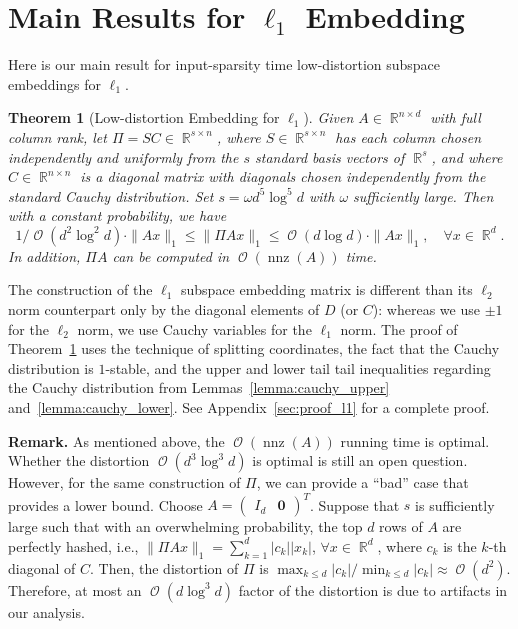 \documentclass[11pt]{article}
\newtheorem{theorem}{Theorem}
\DeclareMathOperator{\bigO}{\mathcal{O}}
\DeclareMathOperator{\nnz}{nnz}
\DeclareMathOperator{\R}{\mathbb{R}}
\begin{document}
\section{Main Results for $\ell_1$ Embedding}
\label{sxn:l1} 

Here is our main result for input-sparsity time low-distortion subspace
embeddings for $\ell_1$.

\begin{theorem}[Low-distortion Embedding for $\ell_1$]
  \label{thm:sparse_l1}
  Given $A \in \R^{n \times d}$ with full column rank, let $\Pi = S C \in \R^{s
    \times n}$, where $S \in \R^{s \times n}$ has each column chosen
  independently and uniformly from the $s$ standard basis vectors of $\R^s$, and
  where $C \in \R^{n \times n}$ is a diagonal matrix with diagonals chosen
  independently from the standard Cauchy distribution.
  Set $s = \omega d^5 \log^5 d$ with $\omega$ sufficiently large.
  Then with a constant probability, we have
  \begin{equation*}
    1/\bigO(d^{2} \log^2 d) \cdot \|A x\|_1 \leq \|\Pi A x\|_1 \leq \bigO( d \log d ) \cdot \|A x\|_1, \quad \forall x \in \R^{d}.
  \end{equation*}
  In addition, $\Pi A$ can be computed in $\bigO(\nnz(A))$ time.
\end{theorem}

\noindent
The construction of the $\ell_1$ subspace embedding matrix is different than its
$\ell_2$ norm counterpart only by the diagonal elements of $D$ (or $C$): whereas
we use $\pm 1$ for the $\ell_2$ norm, we use Cauchy variables for the $\ell_1$
norm. 
The proof of Theorem~\ref{thm:sparse_l1} uses the technique of splitting
coordinates, the fact that the Cauchy distribution is $1$-stable, and the upper
and lower tail tail inequalities regarding the Cauchy distribution from
Lemmas~\ref{lemma:cauchy_upper} and~\ref{lemma:cauchy_lower}.
See Appendix~\ref{sec:proof_l1} for a complete proof.

\noindent
\textbf{Remark.} 
As mentioned above, the $\bigO(\nnz(A))$ running time is optimal.
Whether the distortion $\bigO(d^3 \log^3 d)$ is optimal is still an open
question. 
However, for the same construction of $\Pi$, we can provide a ``bad'' case that
provides a lower bound.
Choose $A =
\begin{pmatrix}
  I_d & \mathbf{0}
\end{pmatrix}^T$.
Suppose that $s$ is sufficiently large such that with an overwhelming
probability, the top $d$ rows of $A$ are perfectly hashed, i.e., $\|\Pi A x\|_1
= \sum_{k=1}^d |c_k||x_k|$, $\forall x \in \R^d$, where $c_k$ is the $k$-th
diagonal of $C$.
Then, the distortion of $\Pi$ is $\max_{k \leq d} |c_k| / \min_{k \leq d} |c_k|
\approx \bigO(d^2)$. 
Therefore, at most an $\bigO(d \log^3 d)$ factor of the distortion is due to
artifacts in our analysis.
\end{document}
